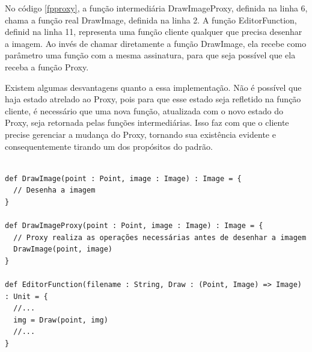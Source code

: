 No código \ref{fpproxy}, a função intermediária 
DrawImageProxy, definida na linha 6, chama a 
função real DrawImage, definida na linha 2. 
A função EditorFunction, definid na linha 11, 
representa uma função cliente qualquer que 
precisa desenhar a imagem. Ao invés de chamar 
diretamente a função DrawImage, ela recebe 
como parâmetro uma função com a mesma assinatura, 
para que seja possível que ela receba a função 
Proxy.

Existem algumas desvantagens quanto a essa 
implementação. Não é possível que haja 
estado atrelado ao Proxy, pois para que 
esse estado seja refletido na função 
cliente, é necessário que uma nova função, 
atualizada com o novo estado do Proxy, seja 
retornada pelas funções intermediárias. 
Isso faz com que o cliente precise gerenciar 
a mudança do Proxy, tornando sua existência 
evidente e consequentemente tirando 
um dos propósitos do padrão. 

\begin{lstlisting}[caption={Proxy Funcional},label=fpproxy]
    
def DrawImage(point : Point, image : Image) : Image = {
  // Desenha a imagem
}

def DrawImageProxy(point : Point, image : Image) : Image = {
  // Proxy realiza as operações necessárias antes de desenhar a imagem
  DrawImage(point, image)
}

def EditorFunction(filename : String, Draw : (Point, Image) => Image) : Unit = {
  //...
  img = Draw(point, img)
  //...
}
    
\end{lstlisting}